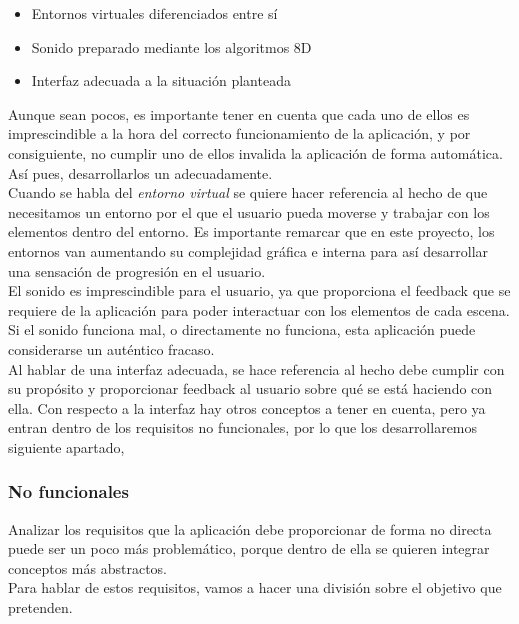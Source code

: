 \begin{itemize}
	\item Entornos virtuales diferenciados entre sí
	\item Sonido preparado mediante los algoritmos 8D
	\item Interfaz adecuada a la situación planteada
\end{itemize}

\quad Aunque sean pocos, es importante tener en cuenta que cada uno de ellos es imprescindible a la hora del correcto funcionamiento de la aplicación, y por consiguiente, no cumplir uno de ellos invalida la aplicación de forma automática. Así pues, desarrollarlos un adecuadamente.\\

\quad Cuando se habla del \textit{entorno virtual} se quiere hacer referencia al hecho de que necesitamos un entorno por el que el usuario pueda moverse y trabajar con los elementos dentro del entorno. Es importante remarcar que en este proyecto, los entornos van aumentando su complejidad gráfica e interna para así desarrollar una sensación de progresión en el usuario.\\

\quad El sonido es imprescindible para el usuario, ya que proporciona el feedback que se requiere de la aplicación para poder interactuar con los elementos de cada escena. Si el sonido funciona mal, o directamente no funciona, esta aplicación puede considerarse un auténtico fracaso.\\

\quad Al hablar de una interfaz adecuada, se hace referencia al hecho debe cumplir con su propósito y proporcionar feedback al usuario sobre qué se está haciendo con ella. Con respecto a la interfaz hay otros conceptos a tener en cuenta, pero ya entran dentro de los requisitos no funcionales, por lo que los desarrollaremos siguiente apartado,\\

\subsubsection{No funcionales}

\quad Analizar los requisitos que la aplicación debe proporcionar de forma no directa puede ser un poco más problemático, porque dentro de ella se quieren integrar conceptos más abstractos.\\
\quad Para hablar de estos requisitos, vamos a hacer una división sobre el objetivo que pretenden.

